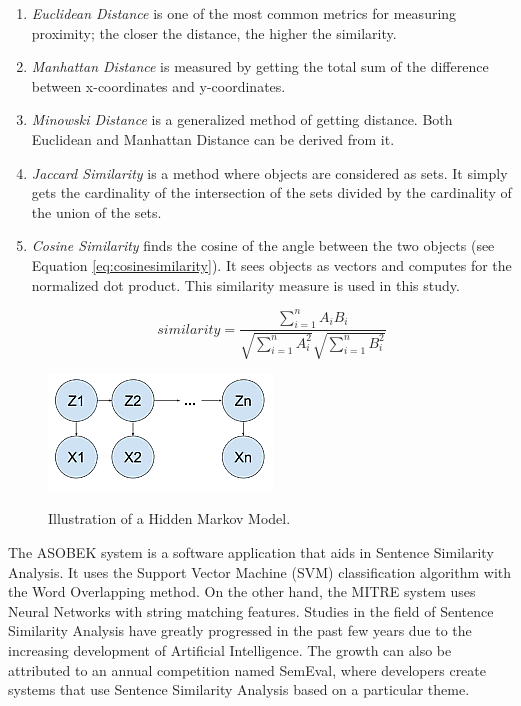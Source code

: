\documentclass[journal]{./IEEEtran}
\begin{document}
	\begin{enumerate}
		\item \emph{Euclidean Distance} is one of the most common metrics for measuring proximity; the closer the distance, the higher the similarity.		\item \emph{Manhattan Distance} is measured by getting the total sum of the difference between x-coordinates and y-coordinates.
		\item \emph{Minowski Distance} is a generalized method of getting distance. Both Euclidean and Manhattan Distance can be derived from it.
		\item \emph{Jaccard Similarity} is a method where objects are considered as sets. It simply gets the cardinality of the intersection of the sets divided by the cardinality of the union of the sets.
		\item \emph{Cosine Similarity} finds the cosine of the angle between the two objects (see Equation \ref{eq:cosinesimilarity}). It sees objects as vectors and computes for the normalized dot product. This similarity measure is used in this study. 
		
	    \begin{equation}
	        similarity = \frac{\sum_{i=1}^{n}A_i B_i}{\sqrt{\sum_{i=1}^{n}A_i^2} \sqrt{\sum_{i=1}^{n} B_i^2}}
	        \label{eq:cosinesimilarity}
	    \end{equation}
		
	\end{enumerate}
	
	\begin{figure}
		\includegraphics{trellis}
		\label{trellis}
		\caption{Illustration of a Hidden Markov Model.}
	\end{figure}
	
	The ASOBEK system is a software application that aids in Sentence Similarity Analysis. It uses the Support Vector Machine (SVM) classification algorithm with the Word Overlapping method. On the other hand, the MITRE system uses Neural Networks with string matching features. Studies in the field of Sentence Similarity Analysis have greatly progressed in the past few years due to the increasing development of Artificial Intelligence. The growth can also be attributed to an annual competition named SemEval\cite{kashyap15}, where developers create systems that use Sentence Similarity Analysis based on a particular theme.
	
\end{document}
